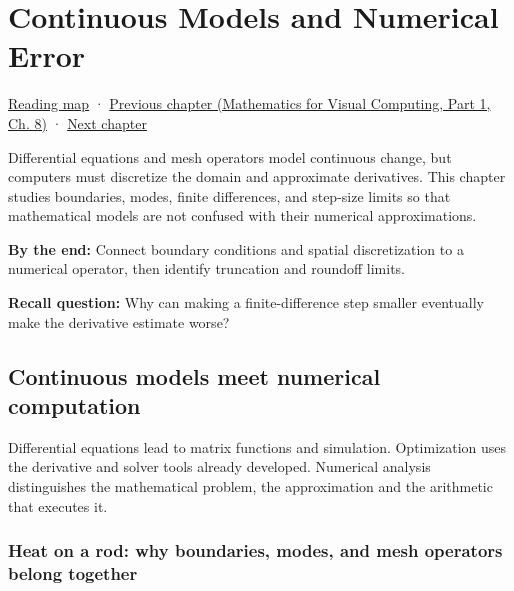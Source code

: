 \chapter{Continuous Models and Numerical Error}\label{02-foundations-ii-ch025-continuous-models-and-numerical-error}\hypertarget{02-foundations-ii-ch025}{}\label{stagechapter:02-foundations-ii-ch025}

\hypertarget{02-foundations-ii-ch025-continuous-models-and-numerical-error}{}

\hyperref[volume-reading-map]{Reading map} · \href{../02-Mathematics-for-Visual-Computing-P01/main.pdf\#nameddest=02-foundations-ii-ch024-waiting-times-covariance-and-matrix-decomposition}{Previous chapter (Mathematics for Visual Computing, Part 1, Ch. 8)} · \hyperref[02-foundations-ii-ch026-matrix-functions-and-nonlinear-least-squares]{Next chapter}

Differential equations and mesh operators model continuous change, but computers must discretize the domain and approximate derivatives. This chapter studies boundaries, modes, finite differences, and step-size limits so that mathematical models are not confused with their numerical approximations.

\textbf{By the end:} Connect boundary conditions and spatial discretization to a numerical operator, then identify truncation and roundoff limits.

\textbf{Recall question:} Why can making a finite-difference step smaller eventually make the derivative estimate worse?

\section{Continuous models meet numerical computation}\label{02-foundations-ii-ch025-continuous-models-meet-numerical-computation}

\hypertarget{02-foundations-ii-ch025-continuous-models-meet-numerical-computation}{}

Differential equations lead to matrix functions and simulation. Optimization uses the derivative and solver tools already developed. Numerical analysis distinguishes the mathematical problem, the approximation and the arithmetic that executes it.

\subsection{Heat on a rod: why boundaries, modes, and mesh operators belong together}\label{02-foundations-ii-ch025-heat-on-a-rod-why-boundaries-modes-and-mesh-operators-belong-together}

